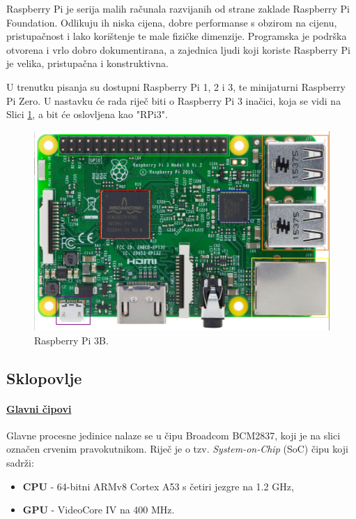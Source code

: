 \documentclass[12pt,a4paper]{article}
\begin{document}
Raspberry Pi je serija malih računala razvijanih od strane zaklade Raspberry Pi Foundation. Odlikuju ih niska cijena, dobre performanse s obzirom na cijenu, pristupačnost i lako korištenje te male fizičke dimenzije. Programska je podrška otvorena i vrlo dobro dokumentirana, a zajednica ljudi koji koriste Raspberry Pi je velika, pristupačna i konstruktivna. \\
\par
U trenutku pisanja su dostupni Raspberry Pi 1, 2 i 3, te minijaturni Raspberry Pi Zero. U nastavku će rada riječ biti o Raspberry Pi 3 inačici, koja se vidi na Slici \ref{fig:rpi3}, a bit će oslovljena kao "RPi3".
\begin{figure}[h!]
  \includegraphics[width=\linewidth]{slike/rpi3_color.png}
  \caption{Raspberry Pi 3B.}
  \label{fig:rpi3}
\end{figure}

	\subsection{Sklopovlje}
		\paragraph{\underline{Glavni čipovi}} %
		\label{par:main_chips}
		
		Glavne procesne jedinice nalaze se u čipu Broadcom BCM2837, koji je na slici označen crvenim pravokutnikom. Riječ je o tzv. \textit{System-on-Chip} (SoC) čipu koji sadrži:
		\begin{itemize}
			\item \textbf{CPU} - 64-bitni ARMv8 Cortex A53 s četiri jezgre na 1.2 GHz,
			\item \textbf{GPU} - VideoCore IV na 400 MHz.
		\end{itemize}
\end{document}
